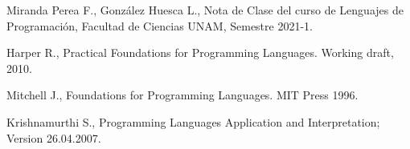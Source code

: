 \documentclass[12pt]{extarticle}
\begin{document}
\begin{thebibliography}{9}

Miranda Perea F., González Huesca L., Nota de Clase del curso de Lenguajes de Programación, Facultad de Ciencias UNAM, Semestre 2021-1.



Harper R., Practical Foundations for Programming Languages. Working draft, 2010.

Mitchell J., Foundations for Programming Languages. MIT Press 1996.

Krishnamurthi S., Programming Languages Application and Interpretation; Version 26.04.2007.



\end{thebibliography}
\end{document}
